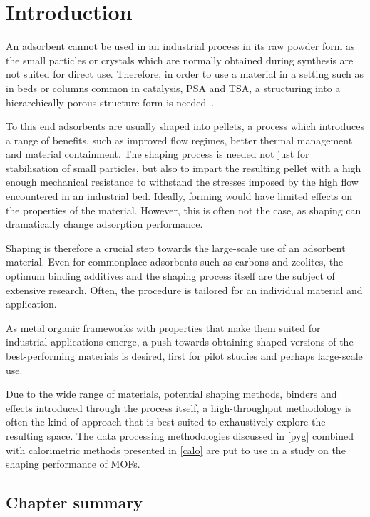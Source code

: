 
\section{Introduction}

An adsorbent cannot be used in an industrial process in its raw powder
form as the small particles or crystals which are normally obtained during
synthesis are not suited for direct use. Therefore, in order to use a 
material in a setting such 
as in beds or columns common in catalysis, \gls{PSA} and \gls{TSA},
a structuring into a hierarchically porous structure form is 
needed~\cite{akhtarStructuringAdsorbentsCatalysts2014}.

To this end adsorbents are usually shaped into pellets, a process
which introduces a range of benefits, such as improved flow regimes,
better thermal management and material containment. The shaping process
is needed not just for stabilisation of small particles, but also to
impart the resulting pellet with a high enough mechanical resistance 
to withstand the stresses imposed by the high flow encountered in 
an industrial bed. Ideally, forming would have limited effects on
the properties of the material. However, this is often not the case, 
as shaping can dramatically change adsorption performance.

Shaping is therefore a crucial step towards the large-scale
use of an adsorbent material. Even for commonplace adsorbents such as
carbons and zeolites, the optimum binding additives and the shaping
process itself are the subject of extensive research. Often, the
procedure is tailored for an individual material and application.

As metal organic frameworks with properties that make them suited 
for industrial applications emerge, a push towards obtaining shaped
versions of the best-performing materials is desired, first for 
pilot studies and perhaps large-scale use.

Due to the wide range of materials, potential shaping methods, binders 
and effects introduced through the process itself, a high-throughput
methodology is often the kind of approach that is best suited to 
exhaustively explore the resulting space. The data processing methodologies
discussed in \autoref{pyg} combined with calorimetric methods
presented in \autoref{calo} are put to use in a study on the 
shaping performance of \glspl{MOF}.

\subsection*{Chapter summary}


